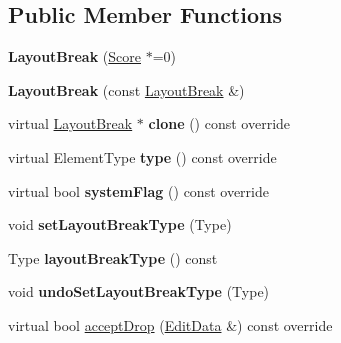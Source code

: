 \subsection*{Public Member Functions}
\begin{DoxyCompactItemize}
\item 
\mbox{\label{class_ms_1_1_layout_break_a8968a350a8b32bd5e3e2848f476cfe13}} 
{\bfseries Layout\+Break} (\hyperlink{class_ms_1_1_score}{Score} $\ast$=0)
\item 
\mbox{\label{class_ms_1_1_layout_break_a8cbb0da5aab2de5d1be7943ecc6f91ad}} 
{\bfseries Layout\+Break} (const \hyperlink{class_ms_1_1_layout_break}{Layout\+Break} \&)
\item 
\mbox{\label{class_ms_1_1_layout_break_a71e9e9004111b50578d341ac998d4ecf}} 
virtual \hyperlink{class_ms_1_1_layout_break}{Layout\+Break} $\ast$ {\bfseries clone} () const override
\item 
\mbox{\label{class_ms_1_1_layout_break_a3d3e590e7b8af938e8d173cfe038637d}} 
virtual Element\+Type {\bfseries type} () const override
\item 
\mbox{\label{class_ms_1_1_layout_break_a42a3478e03e952b36cafb4b1b7505da6}} 
virtual bool {\bfseries system\+Flag} () const override
\item 
\mbox{\label{class_ms_1_1_layout_break_ad73708757e9be93495872529a694d303}} 
void {\bfseries set\+Layout\+Break\+Type} (Type)
\item 
\mbox{\label{class_ms_1_1_layout_break_a3afb1e65efced58a5f5dbbe3f0389e1a}} 
Type {\bfseries layout\+Break\+Type} () const
\item 
\mbox{\label{class_ms_1_1_layout_break_af6f0f031e269fed446cc06f266aeeb02}} 
void {\bfseries undo\+Set\+Layout\+Break\+Type} (Type)
\item 
virtual bool \hyperlink{class_ms_1_1_layout_break_a69134cfdef22b53fdbb0e14a5c8705d8}{accept\+Drop} (\hyperlink{class_ms_1_1_edit_data}{Edit\+Data} \&) const override
\item 

\end{DoxyCompactItemize}
